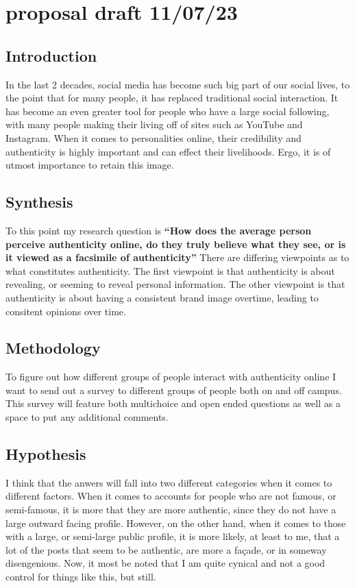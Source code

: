 \documentclass[12pt]{article}
\begin{document}
\thispagestyle{1stPage}
\hfill
\tableofcontents
\newpage
    \section{proposal draft 11/07/23}
        \subsection{Introduction}
            In the last 2 decades, social media has become such big part of our social lives, to the point that for many people, it has replaced traditional social interaction.
            It has become an even greater tool for people who have a large social following, with many people making their living off of sites such as YouTube and Instagram.
            When it comes to personalities online, their credibility and authenticity is highly important and can effect their livelihoods.
            Ergo, it is of utmost importance to retain this image.
        \subsection{Synthesis}
            To this point my research question is \textbf{``How does the average person perceive authenticity online, do they truly believe what they see, or is it viewed as a facsimile of authenticity''}
            There are differing viewpoints as to what constitutes authenticity. The first viewpoint is that authenticity is about revealing, or seeming to reveal personal information.
            The other viewpoint is that authenticity is about having a consistent brand image overtime, leading to consitent opinions over time.
        \subsection{Methodology}
            To figure out how different groups of people interact with authenticity online I want to send out a survey to different groups of people both on and off campus.
            This survey will feature both multichoice and open ended questions as well as a space to put any additional comments.
        \subsection{Hypothesis} 
            I think that the anwers will fall into two different categories when it comes to different factors. When it comes to accounts for people who are not famous, or semi-famous, it is more that they are more authentic, since they do not have a large outward facing profile.
            However, on the other hand, when it comes to those with a large, or semi-large public profile, it is more likely, at least to me, that a lot of the posts that seem to be authentic, are more a façade, or in someway disengenious. Now, it most be noted that I am quite cynical and not a good control for things like this, but still.
    \newpage
    \nocite{*}
    \printbibliography[
        heading= bibintoc,
        title ={Annotated Bibliography}
    ]
\end{document}
